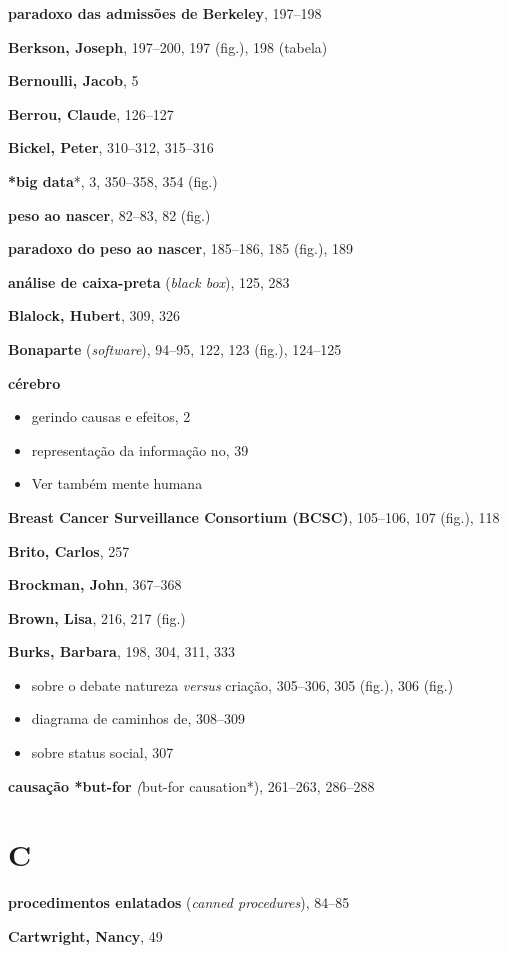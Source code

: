 \documentclass[11pt,a5paper,twoside]{book}
\begin{document}
\textbf{paradoxo das admissões de Berkeley}, 197–198

\textbf{Berkson, Joseph}, 197–200, 197 (fig.), 198 (tabela)

\textbf{Bernoulli, Jacob}, 5

\textbf{Berrou, Claude}, 126–127

\textbf{Bickel, Peter}, 310–312, 315–316

\textbf{*big data}*, 3, 350–358, 354 (fig.)

\textbf{peso ao nascer}, 82–83, 82 (fig.)

\textbf{paradoxo do peso ao nascer}, 185–186, 185 (fig.), 189

\textbf{análise de caixa-preta} (\textit{black box}), 125, 283

\textbf{Blalock, Hubert}, 309, 326

\textbf{Bonaparte} (\textit{software}), 94–95, 122, 123 (fig.), 124–125

\textbf{cérebro}

\begin{itemize}
\item gerindo causas e efeitos, 2
\item representação da informação no, 39
\item Ver também mente humana
\end{itemize}
\textbf{Breast Cancer Surveillance Consortium (BCSC)}, 105–106, 107 (fig.), 118

\textbf{Brito, Carlos}, 257

\textbf{Brockman, John}, 367–368

\textbf{Brown, Lisa}, 216, 217 (fig.)

\textbf{Burks, Barbara}, 198, 304, 311, 333

\begin{itemize}
\item sobre o debate natureza \textit{versus} criação, 305–306, 305 (fig.), 306 (fig.)
\item diagrama de caminhos de, 308–309
\item sobre status social, 307
\end{itemize}
\textbf{causação *but-for}\textit{ (}but-for causation*), 261–263, 286–288

\section{C}
\textbf{procedimentos enlatados} (\textit{canned procedures}), 84–85

\textbf{Cartwright, Nancy}, 49
\end{document}
